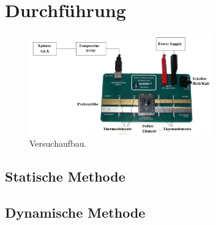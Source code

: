 \section{Durchführung}
\label{sec:Durchfuehrung}
\begin{figure}
    \centering
    \includegraphics[width=0.7\textwidth]{Versuchaufbau.png}
    \caption{Versuchaufbau.}
    \label{fig:versuchaufbau}
  \end{figure}

\subsection{Statische Methode}
\label{sec:StatischeMethode}


\subsection{Dynamische Methode}
\label{sec:DynamischeMethode}